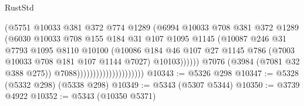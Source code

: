 \begin{lexlean}{RustStd}
\begin{coremodule}
                                                (@5751
                                                  @10033
                                                  @381
                                                  @372
                                                  @774
                                                  @1289
                                                  (@6994
                                                    @10033
                                                    @708
                                                    @381
                                                    @372
                                                    @1289
                                                    (@6030
                                                      @10033
                                                      @708
                                                      @155
                                                      @184
                                                      @31
                                                      @107
                                                      @1095
                                                      @1145
                                                      (@10087
                                                        @246
                                                        @31
                                                        @7793
                                                        @1095
                                                        @8110
                                                        @10100
                                                        (@10086
                                                          @184
                                                          @46
                                                          @107
                                                          @27
                                                          @1145
                                                          @786
                                                          (@7003 @10033 @708 @181 @107 @1144 @7027)
                                                          @10103))))))
                                              @7076
                                              (@3984 (@7081 @32 @388 @275))
                                              @7088)))))))))))))))))))))
@10343 := @5326 @298
@10347 := @5328 (@5332 @298) (@5338 @298)
@10349 := @5343 (@5307 @5344)
@10350 := @3739 @4922
@10352 := @5343 (@10350 @5371)

\end{coremodule}
\end{lexlean}

